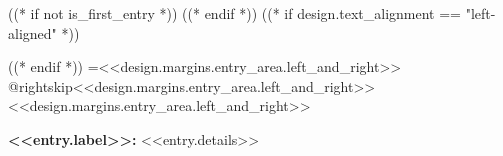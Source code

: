 ((* if not is_first_entry *))
\vspace{<<design.margins.entry_area.vertical_between>>}
((* endif *))
\begingroup((* if design.text_alignment == "left-aligned" *))\raggedright((* endif *))
\leftskip=<<design.margins.entry_area.left_and_right>>
\advance\csname @rightskip\endcsname <<design.margins.entry_area.left_and_right>>
\advance\rightskip <<design.margins.entry_area.left_and_right>>

\textbf{<<entry.label>>:} <<entry.details>>
\par\endgroup